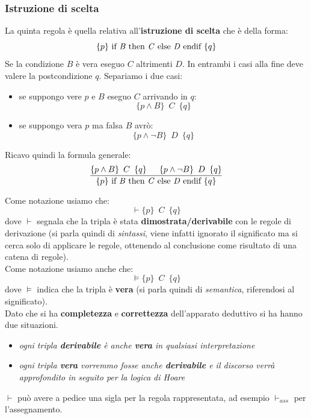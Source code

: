 \documentclass[a4paper,12pt, oneside]{book}
\begin{document}
\subsubsection{Istruzione di scelta}
\begin{definizione}
  La quinta regola è quella relativa all'\textbf{istruzione di scelta} che è
  della forma:
  \[\{p\}\mbox{ if \textit{B} then \textit{C} else \textit{D} endif }\{q\}\]
  Se la condizione $B$ è vera eseguo $C$ altrimenti $D$. In entrambi i casi
  alla fine deve valere la postcondizione $q$. Separiamo i due casi:
  \begin{itemize}
    \item se suppongo vere $p$ e $B$ eseguo $C$ arrivando in $q$:
    \[\{p\land B\}\,\,\,C\,\,\,\{q\}\]
    \item se suppongo vera $p$ ma falsa $B$ avrò:
    \[\{p\land \neg B\}\,\,\,D\,\,\,\{q\}\]
  \end{itemize}
  Ricavo quindi la formula generale:
  \[\frac{\{p\land B\}\,\,\,C\,\,\,\{q\}\,\,\,\,\,\,\,\,\,
      \{p\land \neg B\}\,\,\,D\,\,\,\{q\}}{\{p\}\mbox{ if \textit{B}
        then \textit{C} else \textit{D} endif }\{q\}}\]
\end{definizione}
\begin{shaded}
  Come notazione usiamo che:
  \[\vdash \{p\}\,\,\,C\,\,\,\{q\}\]
  dove $\vdash$
segnala che la tripla è stata \textbf{dimostrata/derivabile} con le regole di
derivazione (si parla quindi di \textit{sintassi}, viene infatti ignorato il
significato ma si cerca solo di applicare le regole, ottenendo al conclusione
come risultato di una catena di regole).\\
Come notazione usiamo anche che:
\[\vDash \{p\}\,\,\,C\,\,\,\{q\}\]
dove $\vDash$
indica che la tripla è \textbf{vera} (si parla quindi di \textit{semantica},
riferendosi al significato).\\
Dato che si ha \textbf{completezza} e \textbf{correttezza} dell'apparato
deduttivo si ha hanno due situazioni.
\begin{itemize}
  \item \textit{ogni tripla \textbf{derivabile} è anche \textbf{vera} in
    qualsiasi interpretazione}
  \item \textit{ogni tripla \textbf{vera} vorremmo fosse anche
    \textbf{derivabile} e il discorso verrà approfondito in seguito per la
    logica di Hoare}
\end{itemize}
$\vdash$ può avere a pedice una sigla per la regola rappresentata, ad esempio
$\vdash_{ass}$ per l'assegnamento.
\end{shaded}
\end{document}
